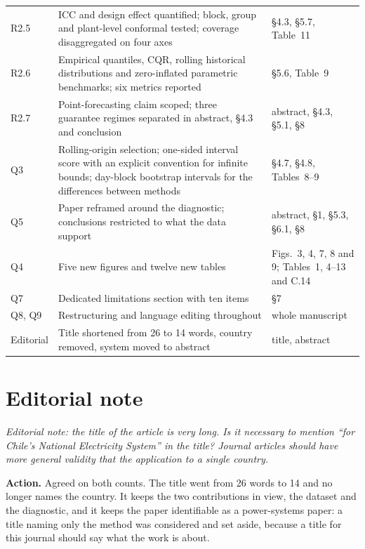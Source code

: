 \documentclass[11pt,a4paper]{article}
\newenvironment{revcomment}
  {\begin{mdframed}[backgroundcolor=quotebg,linecolor=quoterule,linewidth=0.4pt,
    innertopmargin=6pt,innerbottommargin=6pt,skipabove=8pt,skipbelow=8pt]\itshape}
  {\end{mdframed}}
\newcommand{\action}[1]{\textbf{Action.} #1}
\begin{document}
\begin{tabular}{@{}p{}p{}p{}@{}}
R2.5 & ICC and design effect quantified; block, group and plant-level conformal tested; coverage disaggregated on four axes & \S4.3, \S5.7, Table~11 \\
R2.6 & Empirical quantiles, CQR, rolling historical distributions and zero-inflated parametric benchmarks; six metrics reported & \S5.6, Table~9 \\
R2.7 & Point-forecasting claim scoped; three guarantee regimes separated in abstract, \S4.3 and conclusion & abstract, \S4.3, \S5.1, \S8 \\
Q3 & Rolling-origin selection; one-sided interval score with an explicit convention for infinite bounds; day-block bootstrap intervals for the differences between methods & \S4.7, \S4.8, Tables~8--9 \\
Q5 & Paper reframed around the diagnostic; conclusions restricted to what the data support & abstract, \S1, \S5.3, \S6.1, \S8 \\
Q4 & Five new figures and twelve new tables & Figs.~3, 4, 7, 8 and 9; Tables~1, 4--13 and C.14 \\
Q7 & Dedicated limitations section with ten items & \S7 \\
Q8, Q9 & Restructuring and language editing throughout & whole manuscript \\
Editorial & Title shortened from 26 to 14 words, country removed, system moved to abstract & title, abstract \\
\bottomrule
\end{tabular}

\clearpage
\section{Editorial note}

\begin{revcomment}
Editorial note: the title of the article is very long. Is it necessary to mention ``for Chile's National Electricity System'' in the title? Journal articles should have more general validity that the application to a single country.
\end{revcomment}

\action{Agreed on both counts. The title went from 26 words to 14 and no longer names the country. It keeps the two contributions in view, the dataset and the diagnostic, and it keeps the paper identifiable as a power-systems paper: a title naming only the method was considered and set aside, because a title for this journal should say what the work is about.}
\end{document}
